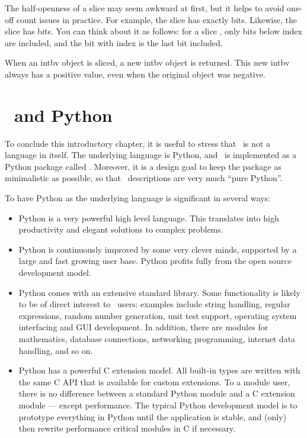 The half-openness of a slice may seem awkward at first, but it helps
to avoid one-off count issues in practice. For example, the slice
 has exactly  bits. Likewise, the slice
 has  bits. You can think about it as
follows: for a slice \code{[i:j]}, only bits below index  are
included, and the bit with index  is the last bit included.

When an intbv object is sliced, a new intbv object is returned. This
new intbv always has a positive value, even when the original object
was negative.


\section{\myhdl\ and Python \label{intro-python}}

To conclude this introductory chapter, it is useful to stress that
\myhdl\ is not a language in itself. The underlying language is Python, 
and \myhdl\ is implemented as a Python package called .
Moreover, it is a design goal to keep the  package as
minimalistic as possible, so that \myhdl\ descriptions are very much
``pure Python''.

To have Python as the underlying language is significant in several
ways:

\begin{itemize}

\item Python is a very powerful high level language. This translates
into high productivity and elegant solutions to complex problems.

\item  Python is continuously improved by some very clever 
minds, supported by a large and fast growing user base. Python profits
fully from the open source development model.

\item Python comes with an extensive standard library. Some
functionality is likely to be of direct interest to \myhdl\ users:
examples include string handling, regular expressions, random number
generation, unit test support, operating system interfacing and GUI
development. In addition, there are modules for mathematics, database
connections, networking programming, internet data handling, and so
on.

\item Python has a powerful C extension model. All built-in types are
written with the same C API that is available for custom
extensions. To a module user, there is no difference between a
standard Python module and a C extension module --- except
performance. The typical Python development model is to prototype
everything in Python until the application is stable, and (only) then
rewrite performance critical modules in C if necessary.

\end{itemize}




